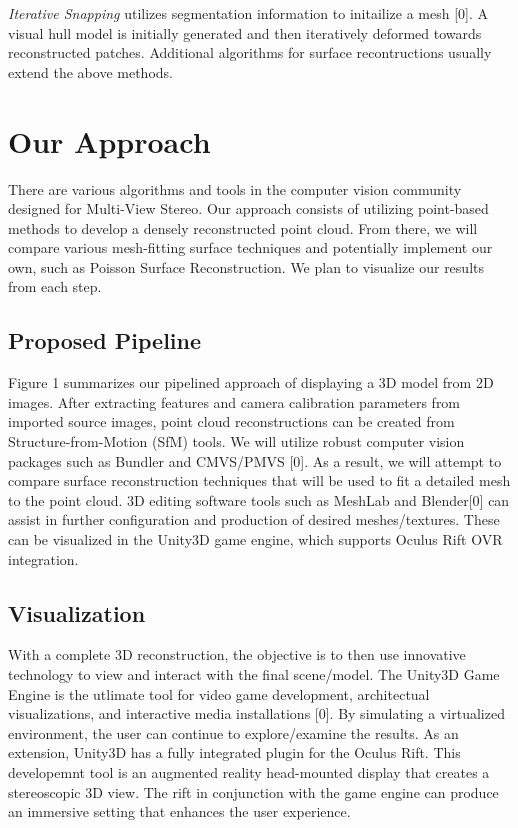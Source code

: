 \documentclass[10pt,twocolumn,letterpaper]{article}
\begin{document}
\textit{Iterative Snapping} utilizes segmentation information to initailize a mesh [0].  A visual hull model is initially generated and then iteratively deformed towards reconstructed patches.  Additional algorithms for surface recontructions usually extend the above methods.


\section{Our Approach}
There are various algorithms and tools in the computer vision community designed for Multi-View Stereo.  Our approach consists of utilizing point-based methods to develop a densely reconstructed point cloud.  From there, we will compare various mesh-fitting surface techniques and potentially implement our own, such as Poisson Surface Reconstruction.  We plan to visualize our results from each step.

\subsection{Proposed Pipeline}
Figure 1 summarizes our pipelined approach of displaying a 3D model from 2D images.  After extracting features and camera calibration parameters from imported source images, point cloud reconstructions can be created from Structure-from-Motion (SfM) tools.  We will utilize robust computer vision packages such as Bundler and CMVS/PMVS [0].  As a result, we will attempt to compare surface reconstruction techniques that will be used to fit a detailed mesh to the point cloud.  3D editing software tools such as MeshLab and Blender[0] can assist in further configuration and production of desired meshes/textures.  These can be visualized in the Unity3D game engine, which supports Oculus Rift OVR integration.


\subsection{Visualization}
With a complete 3D reconstruction, the objective is to then use innovative technology to view and interact with the final scene/model. The Unity3D Game Engine is the utlimate tool for video game development, architectual visualizations, and interactive media installations [0].  By simulating a virtualized environment, the user can continue to explore/examine the results.  As an extension, Unity3D has a fully integrated plugin for the Oculus Rift.  This developemnt tool is an augmented reality head-mounted display that creates a stereoscopic 3D view.  The rift in conjunction with the game engine can produce an immersive setting that enhances the user experience.
\end{document}
